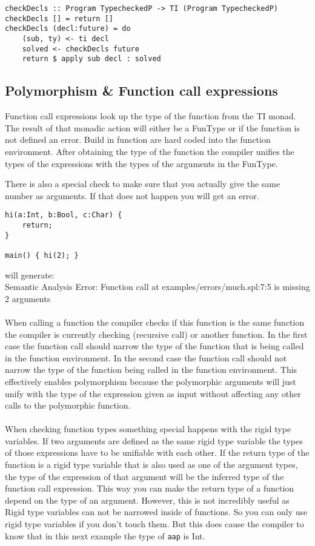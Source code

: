 \documentclass{report}
\begin{document}
\begin{verbatim}
checkDecls :: Program TypecheckedP -> TI (Program TypecheckedP)
checkDecls [] = return []
checkDecls (decl:future) = do
    (sub, ty) <- ti decl
    solved <- checkDecls future
    return $ apply sub decl : solved
\end{verbatim}


\subsection{Polymorphism \& Function call expressions}

Function call expressions look up the type of the function from the TI monad. The result of that monadic action will either be a FunType or if the function is not defined an error. Build in function are hard coded into the function environment. After obtaining the type of the function the compiler unifies the types of the expressions with the types of the arguments in the FunType.

There is also a special check to make sure that you actually give the same number as arguments. If that does not happen you will get an error.

\noindent \begin{lstlisting}[style=SPL]
hi(a:Int, b:Bool, c:Char) { 
    return; 
}

main() { hi(2); }
\end{lstlisting}

\noindent will generate: \\\textcolor{error}{Semantic Analysis Error: Function call at \textcolor{filename}{examples/errors/much.spl:7:5} is missing \textcolor{filename}{2} arguments}
\\\\
\noindent When calling a function the compiler checks if this function is the same function the compiler is currently checking (recursive call) or another function. In the first case the function call should narrow the type of the function that is being called in the function environment. In the second case the function call should not narrow the type of the function being called in the function environment. This effectively enables polymorphism because the polymorphic arguments will just unify with the type of the expression given as input without affecting any other calls to the polymorphic function.  
\\\\
\noindent When checking function types something special happens with the rigid type variables. If two arguments are defined as the same rigid type variable the types of those expressions have to be unifiable with each other. If the return type of the function is a rigid type variable that is also used as one of the argument types, the type of the expression of that argument will be the inferred type of the function call expression. This way you can make the return type of a function depend on the type of an argument. However, this is not incredibly useful as Rigid type variables can not be narrowed inside of functions. So you can only use rigid type variables if you don't touch them. But this does cause the compiler to know that in this next example the type of \texttt{aap} is Int.
\end{document}
